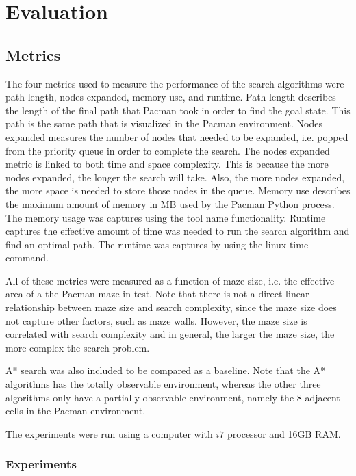 

\section{Evaluation}\label{sec:eval}
	\subsection{Metrics}
    The four metrics used to measure the performance of the search algorithms were path length, nodes expanded, memory use, and runtime. Path length describes the length of the final path that Pacman took in order to find the goal state. This path is the same path that is visualized in the Pacman environment. Nodes expanded measures the number of nodes that needed to be expanded, i.e. popped from the priority queue in order to complete the search. The nodes expanded metric is linked to both time and space complexity. This is because the more nodes expanded, the longer the search will take. Also, the more nodes expanded, the more space is needed to store those nodes in the queue. Memory use describes the maximum amount of memory in MB used by the Pacman Python process. The memory usage was captures using the $\text{tool name}$ functionality. Runtime captures the effective amount of time was needed to run the search algorithm and find an optimal path. The runtime was captures by using the linux $\text{time}$ command. 
    
    All of these metrics were measured as a function of maze size, i.e. the effective area of a the Pacman maze in test. Note that there is not a direct linear relationship between maze size and search complexity, since the maze size does not capture other factors, such as maze walls. However, the maze size is correlated with search complexity and in general, the larger the maze size, the more complex the search problem.
    
    A* search was also included to be compared as a baseline. Note that the A* algorithms has the totally observable environment, whereas the other three algorithms only have a partially observable environment, namely the 8 adjacent cells in the Pacman environment.
    
    The experiments were run using a computer with $i7$ processor and 16GB RAM. 
    
    \subsubsection{Experiments}
    
